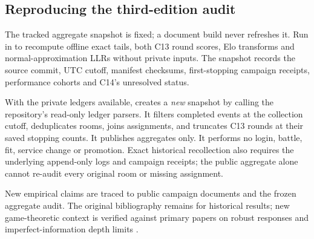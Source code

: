 \subsection{Reproducing the third-edition audit}
The tracked aggregate snapshot is fixed; a document build never refreshes it.
Run  in  to
recompute offline exact tails, both C13 round scores, Elo transforms and
normal-approximation LLRs without private inputs. The snapshot records the
source commit, UTC cutoff, manifest checksums, first-stopping campaign
receipts, performance cohorts and C14's unresolved status.

With the private ledgers available,  creates a
\emph{new} snapshot by calling the repository's read-only ledger parsers.
It filters completed events at the collection cutoff, deduplicates rooms,
joins assignments, and truncates C13 rounds at their saved stopping counts.
It publishes aggregates only. It performs no login, battle, fit, service
change or promotion. Exact historical recollection also requires the
underlying append-only logs and campaign receipts; the public aggregate alone
cannot re-audit every original room or missing assignment.

New empirical claims are traced to public campaign documents and the frozen
aggregate audit. The original bibliography remains for historical results;
new game-theoretic context is verified against primary papers on robust
responses and imperfect-information depth limits \citep{rnash2007,brown2018depth}.
